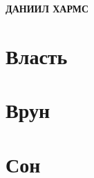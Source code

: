 \documentclass[12pt,a4paper]{article}
\begin{document}
\begin{center}
\Large\textbf{ДАНИИЛ ХАРМС}
\end{center}

\section*{Власть}


\section*{Врун}


\section*{Сон}

\end{document}
